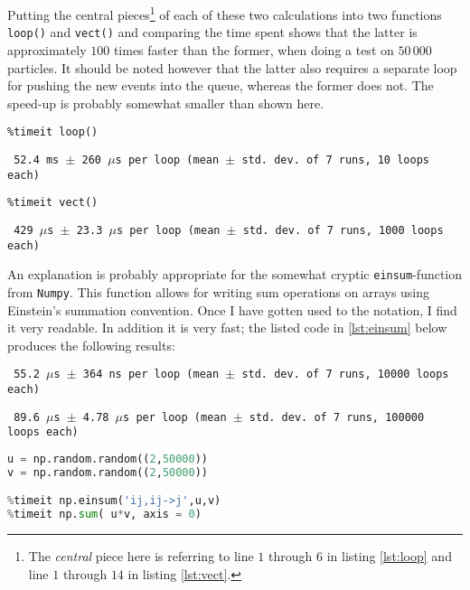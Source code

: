 Putting the central pieces\footnote{The \textit{central} piece here is referring to line $1$ through $6$ in listing \ref{lst:loop} and line $1$ through $14$ in listing \ref{lst:vect}.} of each of these two calculations into two functions \texttt{loop()} and \texttt{vect()} and comparing the time spent shows that the latter is approximately $100$ times faster than the former, when doing a test on $50\,000$ particles. It should be noted however that the latter also requires a separate loop for pushing the new events into the queue, whereas the former does not. The speed-up is probably somewhat smaller than shown here.

\begin{lstlisting}
%timeit loop()
\end{lstlisting}
\texttt{\small
52.4 ms $\pm$ 260 $\mu$s per loop (mean $\pm$ std. dev. of 7 runs, 10 loops each)
}

\begin{lstlisting}
%timeit vect()
\end{lstlisting}
\texttt{\small
429 $\mu$s $\pm$ 23.3 $\mu$s per loop (mean $\pm$ std. dev. of 7 runs, 1000 loops each)
}


An explanation is probably appropriate for the somewhat cryptic \texttt{einsum}-function from \texttt{Numpy}. This function allows for writing sum operations on arrays using Einstein's summation convention. Once I have gotten used to the notation, I find it very readable. In addition it is very fast; the listed code in \ref{lst:einsum} below produces the following results: 

\texttt{\small
55.2 $\mu$s $\pm$ 364 ns per loop (mean $\pm$ std. dev. of 7 runs, 10000 loops each)
}

\texttt{\small 
89.6 $\mu$s $\pm$ 4.78 $\mu$s per loop (mean $\pm$ std. dev. of 7 runs, 100000 loops each)
}
\begin{lstlisting}[language=Python,label={lst:einsum}]
u = np.random.random((2,50000))
v = np.random.random((2,50000))

%timeit np.einsum('ij,ij->j',u,v)
%timeit np.sum( u*v, axis = 0)
\end{lstlisting}